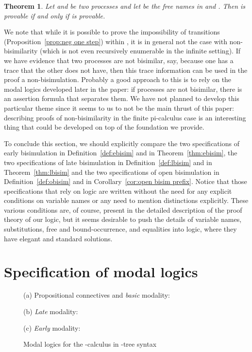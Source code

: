\documentclass{acmtrans2m}
\newtheorem{theorem}{Theorem}
\begin{document}
\begin{theorem}
\label{thm:open-early-bisim}
Let  and  be two processes and let  be the 
free names in  and . Then 
 is provable if and only if
 is provable.
\end{theorem}

We note that while it is possible to prove the impossibility
of transitions (Proposition~\ref{prop:neg one step}) within , 
it is in general not the case with non-bisimilarity (which is 
not even recursively enumerable in the infinite setting). 
If we have evidence that two processes are not
bisimilar, say, because one has a trace that the other does not have,
then this trace information can be used in the proof a
non-bisimulation.  Probably a good approach to this is to rely on
the modal logics developed later in the paper: if processes are not
bisimilar, there is an assertion formula that separates them.  We
have not planned to develop this particular theme since it seems to
us to not be the main thrust of this paper: describing proofs of
non-bisimilarity in the finite pi-calculus case is an interesting thing 
that could be developed on top of the foundation we provide.


To conclude this section, we should explicitly compare 
the two specifications of early bisimulation in Definition~\ref{def:ebisim}
and in Theorem~\ref{thm:ebisim},
the two specifications of late bisimulation in Definition~\ref{def:lbisim} and
in Theorem~\ref{thm:lbisim} and
the two specifications of open bisimulation in Definition~\ref{def:obisim}
and in Corollary~\ref{cor:open bisim prefix}.
Notice that those specifications that rely on logic are
written without the need for any explicit conditions on variable names
or any need to mention distinctions explicitly.  These various
conditions are, of course, present in the detailed description of the
proof theory of our logic, but it seems desirable to push
the details of variable names, substitutions, free and
bound-occurrence, and equalities into logic, where they have elegant
and standard solutions.


\section{Specification of modal logics}
\label{sec:modal}


\begin{figure}[t]
(a) Propositional connectives and {\em basic} modality:

(b) {\em Late} modality:


\vskip11pt
(c) {\em Early} modality:

\caption{Modal logics for the -calculus in -tree syntax}
\label{fig:modal}
\end{figure}
\end{document}
